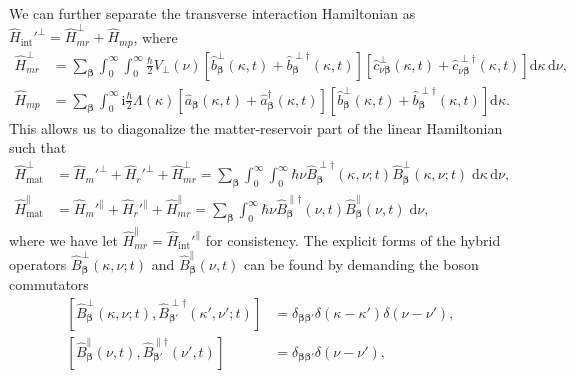 \documentclass{article}
\begin{document}
We can further separate the transverse interaction Hamiltonian as $\hat{H}_\mathrm{int}'^\perp = \hat{H}_{mr}^\perp + \hat{H}_{mp}$, where
\begin{equation}
\begin{split}
\hat{H}_{mr}^\perp &= \sum_{\bm{\beta}}\int_0^\infty\int_0^\infty\frac{\hbar}{2}V_\perp(\nu)\left[\hat{b}_{\bm{\beta}}^\perp(\kappa,t) + \hat{b}_{\bm{\beta}}^{\perp\dagger}(\kappa,t)\right]\left[\hat{c}_{\nu\bm{\beta}}^\perp(\kappa,t) + \hat{c}_{\nu\bm{\beta}}^{\perp\dagger}(\kappa,t)\right]\mathrm{d}\kappa\,\mathrm{d}\nu,\\
\hat{H}_{mp} &= \sum_{\bm{\beta}}\int_0^\infty\mathrm{i}\frac{\hbar}{2}\Lambda(\kappa)\left[\hat{a}_{\bm{\beta}}(\kappa,t) + \hat{a}_{\bm{\beta}}^\dagger(\kappa,t)\right]\left[\hat{b}_{\bm{\beta}}^\perp(\kappa,t) + \hat{b}_{\bm{\beta}}^{\perp\dagger}(\kappa,t)\right]\mathrm{d}\kappa.
\end{split}
\end{equation}
This allows us to diagonalize the matter-reservoir part of the linear Hamiltonian such that
\begin{equation}
\begin{split}
\hat{H}_\mathrm{mat}^\perp &= \hat{H}_m'^\perp + \hat{H}_r'^\perp + \hat{H}_{mr}^\perp = \sum_{\bm{\beta}}\int_0^\infty\int_0^\infty\hbar\nu\hat{B}_{\bm{\beta}}^{\perp\dagger}(\kappa,\nu;t)\hat{B}_{\bm{\beta}}^{\perp}(\kappa,\nu;t)\;\mathrm{d}\kappa\,\mathrm{d}\nu,\\
\hat{H}_\mathrm{mat}^\parallel &= \hat{H}_m'^\parallel + \hat{H}_r'^\parallel + \hat{H}_{mr}^\parallel = \sum_{\bm{\beta}}\int_0^\infty\hbar\nu\hat{B}_{\bm{\beta}}^{\parallel\dagger}(\nu,t)\hat{B}_{\bm{\beta}}^{\parallel}(\nu,t)\;\mathrm{d}\nu,
\end{split}
\end{equation}
where we have let $\hat{H}_{mr}^\parallel = \hat{H}_\mathrm{int}'^\parallel$ for consistency. The explicit forms of the hybrid operators $\hat{B}_{\bm{\beta}}^\perp(\kappa,\nu;t)$ and $\hat{B}_{\bm{\beta}}^\parallel(\nu,t)$ can be found by demanding the boson commutators
\begin{equation}\label{eq:hybridOperatorBosonCommutator1}
\begin{split}
\left[\hat{B}_{\bm{\beta}}^\perp(\kappa,\nu;t),\hat{B}_{\bm{\beta}'}^{\perp\dagger}(\kappa',\nu';t)\right] &= \delta_{\bm{\beta}\bm{\beta}'}\delta(\kappa - \kappa')\delta(\nu - \nu'),\\
\left[\hat{B}_{\bm{\beta}}^\parallel(\nu,t),\hat{B}_{\bm{\beta}'}^{\parallel\dagger}(\nu',t)\right] &= \delta_{\bm{\beta}\bm{\beta}'}\delta(\nu - \nu'),
\end{split}
\end{equation}
\end{document}
